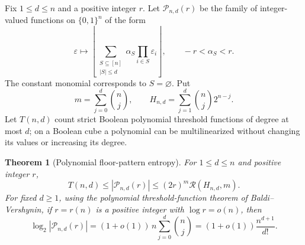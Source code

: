 \documentclass[11pt,letterpaper]{article}
\numberwithin{equation}{section}
\newtheorem{theorem}{Theorem}[section]
\theoremstyle{definition}
\theoremstyle{remark}
\newcommand{\1}{\mathbf 1}
\newcommand{\floor}[1]{\left\lfloor#1\right\rfloor}
\newcommand{\RR}[2]{\mathcal R(#1,#2)}
\begin{document}
Fix $1\le d\le n$ and a positive integer $r$. Let
$\mathcal P_{n,d}(r)$ be the family of integer-valued functions on
$\{0,1\}^n$ of the form
\begin{equation}\label{gsr:fp:01:eq:polyfloor}
 \varepsilon\longmapsto
 \floor{\sum_{\substack{S\subseteq[n]\\|S|\le d}}
            \alpha_S\prod_{i\in S}\varepsilon_i},
 \qquad -r<\alpha_S<r.
\end{equation}
The constant monomial corresponds to $S=\varnothing$. Put
\[
 m=\sum_{j=0}^d\binom nj,\qquad
 H_{n,d}=\sum_{j=1}^d\binom nj2^{n-j}.
\]
Let $T(n,d)$ count strict Boolean polynomial threshold functions of degree
at most $d$; on a Boolean cube a polynomial can be multilinearized without
changing its values or increasing its degree.

\begin{theorem}[Polynomial floor-pattern entropy]\label{gsr:fp:01:thm:polyfloor}
For $1\le d\le n$ and positive integer $r$,
\begin{equation}\label{gsr:fp:01:eq:polyfloorbounds}
 T(n,d)\le|\mathcal P_{n,d}(r)|
          \le(2r)^m\RR{H_{n,d}}{m}.
\end{equation}
For fixed $d\ge1$, using the polynomial threshold-function theorem of
Baldi--Vershynin, if $r=r(n)$ is a positive integer with
$\log r=o(n)$, then
\begin{equation}\label{gsr:fp:01:eq:polyfloorasymp}
 \log_2|\mathcal P_{n,d}(r)|
   =(1+o(1))\,n\sum_{j=0}^d\binom nj
   =(1+o(1))\frac{n^{d+1}}{d!}.
\end{equation}
\end{theorem}
\end{document}
